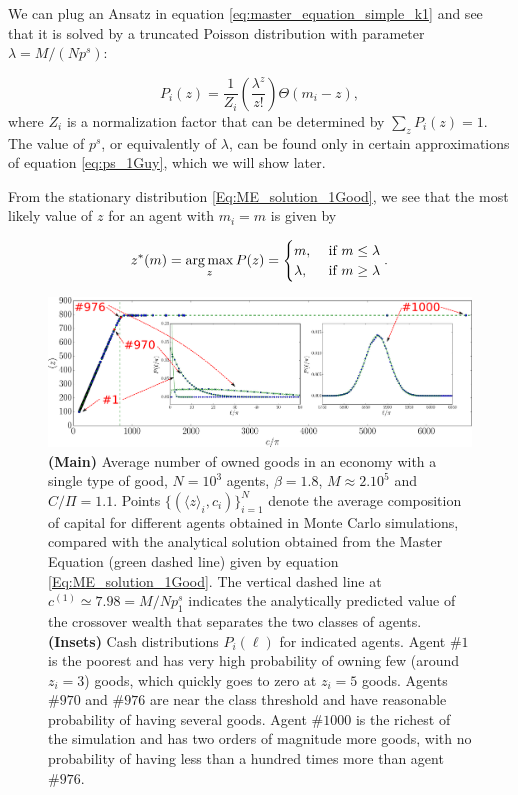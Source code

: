We can plug an Ansatz in equation \eqref{eq:master_equation_simple_k1} and see that it is solved by a truncated Poisson distribution with parameter $\lambda = M / (N p^s)$:

\begin{equation}
P_i(z) = \frac{1}{Z_i} \left( \frac{\lambda^{z}}{z!}\right) \Theta\left(m_i - z \right),
\label{Eq:ME_solution_1Good}
\end{equation}
where $Z_i$ is a normalization factor that can be determined by $\sum_{z} P_i(z) = 1$. The value of $p^s$, or equivalently of $\lambda$, can be found only in certain approximations of equation \eqref{eq:ps_1Guy}, which we will show later.


From the stationary distribution \eqref{Eq:ME_solution_1Good}, we see that the most likely value of $z$ for an agent with $m_i=m$ is given by

\begin{equation}
z^\ast(m)  = \operatorname*{arg\,max}_z  P(z)=
\begin{cases}
    m, & \text{ if } m \leq \lambda \\
    \lambda, & \text{ if } m \geq \lambda
  \end{cases}.
  \label{Eq:cases_ztyp}
\end{equation}

\begin{figure}%
\centering
\includegraphics[width=\textwidth]{figs_ineq/fig3_ownership_average_beta=1p80_e=1p10-byHand.pdf}
\caption{\textbf{(Main)} Average number of owned goods in an economy with a single type of good, $N=10^3$ agents, $\beta=1.8$, $M\approx 2 . 10^5$ and $C/\Pi=1.1$. Points $\{(\langle z \rangle_i,c_i)\}_{i=1}^{N}$ denote the average composition of capital for different agents obtained in Monte Carlo simulations, compared with the analytical solution obtained from the Master Equation (green dashed line) given by equation \eqref{Eq:ME_solution_1Good}. The vertical dashed line at $c^{(1)}\simeq 7.98=M/N p^s_1$ indicates the analytically predicted value of the crossover wealth that separates the two classes of agents. \textbf{(Insets)} Cash distributions $P_i(\ell)$ for indicated agents. Agent $\#1$ is the poorest and has very high probability of owning few (around $z_i = 3$) goods, which quickly goes to zero at $z_i = 5$ goods. Agents $\#970$ and $\#976$ are near the class threshold and have reasonable probability of having several goods. Agent $\#1000$ is the richest of the simulation and has two orders of magnitude more goods, with no probability of having less than a hundred times more than agent $\#976$.}
\label{Fig:Picturesque_RichPoor_transition_beta}
\end{figure}

